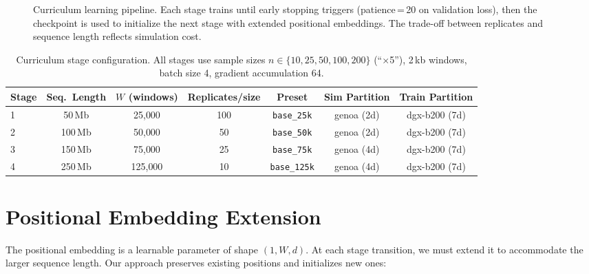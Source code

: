 \documentclass[11pt,a4paper]{article}
\begin{document}
\begin{figure}[h]
\caption{Curriculum learning pipeline. Each stage trains until early stopping triggers (patience\,=\,20 on validation loss), then the checkpoint is used to initialize the next stage with extended positional embeddings. The trade-off between replicates and sequence length reflects simulation cost.}
\label{fig:curriculum}
\end{figure}

\begin{table}[h]
\centering
\caption{Curriculum stage configuration. All stages use sample sizes $n\in\{10, 25, 50, 100, 200\}$ (``$\times$5''), 2\,kb windows, batch size 4, gradient accumulation 64.}
\label{tab:stages}
\begin{tabular}{@{}lcccccc@{}}
\toprule
Stage & Seq.\ Length & $W$ (windows) & Replicates/size & Preset & Sim Partition & Train Partition \\
\midrule
1 & 50\,Mb  & 25{,}000  & 100 & \texttt{base\_25k}  & genoa (2d) & dgx-b200 (7d) \\
2 & 100\,Mb & 50{,}000  & 50  & \texttt{base\_50k}  & genoa (2d) & dgx-b200 (7d) \\
3 & 150\,Mb & 75{,}000  & 25  & \texttt{base\_75k}  & genoa (4d) & dgx-b200 (7d) \\
4 & 250\,Mb & 125{,}000 & 10  & \texttt{base\_125k} & genoa (4d) & dgx-b200 (7d) \\
\bottomrule
\end{tabular}
\end{table}

\section{Positional Embedding Extension}

The positional embedding is a learnable parameter of shape $(1, W, d)$. At each stage transition, we must extend it to accommodate the larger sequence length. Our approach preserves existing positions and initializes new ones:
\end{document}
